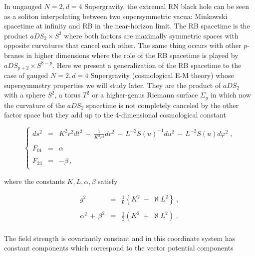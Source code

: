 \documentclass[12pt,a4paper]{article}
\begin{document}
In ungauged $N=2,d=4$ Supergravity, the extremal RN black hole can be
seen as a soliton interpolating between two supersymmetric vacua:
Minkowski spacetime at infinity and RB in the near-horizon limit. The
RB spacetime is the product $aDS_{2}\times S^{2}$ where both factors
are maximally symmetric spaces with opposite curvatures that cancel
each other.  The same thing occurs with other $p$-branes in higher
dimensions \cite{art:GibTown,kn:BST} where the role of the RB spacetime
is played  by $aDS_{p+2}\times S^{8-p}$.  Here we present a
generalization of the RB spacetime to the case of gauged $N=2,d=4$
Supergravity (cosmological E-M theory) whose supersymmetry properties
we will study later. They are the product of $aDS_{2}$ with a sphere
$S^{2}$, a torus $T^{2}$ or a higher-genus Riemann surface
$\Sigma_{g}$ in which now the curvature of the $aDS_{2}$ spacetime is
not completely canceled by the other factor space but they add up to
the 4-dimensional cosmological constant

\begin{equation}
\left\{
\begin{array}{rcl}
ds^{2} & = & K^{2}r^{2}dt^{2}
\,-\,{\displaystyle\frac{1}{K^{2}r^{2}}}dr^{2}
\,-\, L^{-2}S(u)^{-1}du^{2} \,-\, L^{-2}S(u)d\varphi^{2} \; , \\
& & \\
F_{01} & = &  \alpha\, \\
& & \\
F_{23} & = &  -\beta \, ,\\
\end{array}
\right.
\end{equation}

\noindent  where the constants $K,L,\alpha,\beta$ satisfy

\begin{equation}
\begin{array}{rcl}
g^{2} & = & 
\textstyle{\frac{1}{6}}\left\{K^{2}\;-\; \aleph L^{2} \right\}\; , \\
& & \\
\alpha^{2}\,+\, \beta^{2} & = & 
\textstyle{\frac{1}{2}}\left( K^{2}\; +\; \aleph L^{2}\right) \; .\\
\end{array}
\label{eq:RobBertEis}
\end{equation}

\noindent The field strength is covariantly constant  and in this 
coordinate system has constant components which correspond to the
vector potential components
\end{document}
